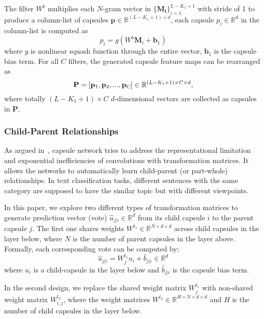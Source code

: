 \documentclass[11pt]{article}
\begin{document}
The filter $W^b$ multiplies each $N$-gram vector in $\mathbf {\{M_i\}}_{i=1}^{L-K_1+1}$ with stride of 1 to produce a column-list of capsules $\mathbf{p} \in \mathbb{R}^{(L-K_1+1) \times d }$, each capsule $p_{i} \in \mathbb{R}^d$ in the column-list is computed as 
\begin{equation}
p_{i}= g(W^b \mathbf{M}_i +\mathbf b_{1}) \end{equation}
where $g$ is nonlinear squash function through the entire vector, $\mathbf b_{1}$ is the capsule bias term. For all $C$ filters, the generated capsule feature maps can be rearranged as
\begin{equation}
\mathbf{P}=[\mathbf{p}_{1},\mathbf{p}_{2},...,\mathbf{p}_{\rm{C}}] \in \mathbb{R}^{(L-K_1+1)\times C \times d},
\end{equation}
where totally $(L-K_1+1)\times C$ $d$-dimensional vectors are collected as capsules in $\mathbf P$. 




\subsubsection{Child-Parent Relationships}
As argued in~\cite{sabour2017dynamic}, capsule network tries to address the representational limitation and exponential inefficiencies of convolutions with transformation matrices. It allows the networks to automatically learn child-parent (or part-whole) relationships. In text classification tasks, different sentences with the same category are supposed to have the similar topic but with different viewpoints.

In this paper, we explore two different types of transformation matrices to generate prediction vector (vote) $\hat{u}_{j|i}\in \mathbb R^d$ from its child capsule $i$ to the parent capsule $j$. The first one shares weights $W^{t_{1}} \in \mathbb{R}^{N\times d\times d}$ across child capsules in the layer below, where $N$ is the number of parent capsules in the layer above. Formally, each corresponding vote can be computed by:
\begin{equation}
\label{eq:1}
\hat{u}_{j|i}=W_j^{t_{1}}u_{i}+\hat{b}_{j|i}\in \mathbb R^d
\end{equation}
where $u_{i}$ is a child-capsule in the layer below and $\hat{b}_{j|i}$ is the capsule bias term. 

In the second design, we replace the shared weight matrix $W_j^{t_{1}}$ with non-shared weight matrix $W_{i,j}^{t_{2}}$,
where the weight matrices $W^{t_2}\in \mathbb{R}^{H \times N\times d\times d}$ and $H$ is the number of child capsules in the layer below.  
\end{document}
